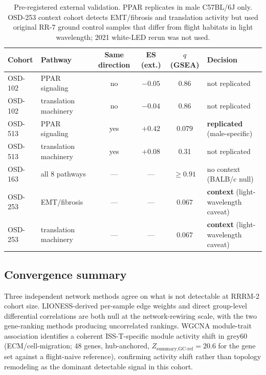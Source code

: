 \documentclass[11pt]{article}
\begin{document}
\begin{table}[h]
\centering\small
\begin{tabular}{llcccp{4cm}}
\toprule
Cohort & Pathway & Same direction & ES (ext.) & $q$ (GSEA) & Decision \\
\midrule
OSD-102 & PPAR signaling & no & $-0.05$ & 0.86 & not replicated \\
OSD-102 & translation machinery & no & $-0.04$ & 0.86 & not replicated \\
OSD-513 & PPAR signaling & yes & $+0.42$ & $\mathbf{0.079}$ & \textbf{replicated} (male-specific) \\
OSD-513 & translation machinery & yes & $+0.08$ & 0.31 & not replicated \\
OSD-163 & all 8 pathways & --- & --- & $\geq 0.91$ & no context (BALB/c null) \\
OSD-253 & EMT/fibrosis & --- & --- & $\mathbf{0.067}$ & \textbf{context} (light-wavelength caveat) \\
OSD-253 & translation machinery & --- & --- & $\mathbf{0.067}$ & \textbf{context} (light-wavelength caveat) \\
\bottomrule
\end{tabular}
\caption{Pre-registered external validation. PPAR replicates in male C57BL/6J only. OSD-253 context cohort detects EMT/fibrosis and translation activity but used original RR-7 ground control samples that differ from flight habitats in light wavelength; 2021 white-LED rerun was not used.}
\label{tab:external}
\end{table}

\subsection{Convergence summary}

Three independent network methods agree on what is not detectable at RRRM-2 cohort size. LIONESS-derived per-sample edge weights and direct group-level differential correlations are both null at the network-rewiring scale, with the two gene-ranking methods producing uncorrelated rankings. WGCNA module-trait association identifies a coherent ISS-T-specific module activity shift in grey60 (ECM/cell-migration; 48 genes, hub-anchored, $Z_{\text{summary,GC-ref}} = 20.6$ for the gene set against a flight-naive reference), confirming activity shift rather than topology remodeling as the dominant detectable signal in this cohort.

\end{document}
